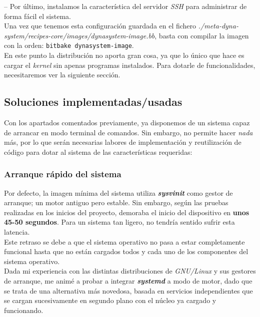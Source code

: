 -- Por último, instalamos la característica del servidor \textit{SSH} para administrar de forma fácil el sistema.\\

Una vez que tenemos esta configuración guardada en el fichero \textit{./meta-dyna-system/recipes-core/images/dynasystem-image.bb}, basta con compilar la imagen con la orden: \texttt{bitbake dynasystem-image}.\\

En este punto la distribución no aporta gran cosa, ya que lo único que hace es cargar el \textit{kernel} sin apenas programas instalados. Para dotarle de funcionalidades, necesitaremos ver la siguiente sección.

\subsection{Soluciones implementadas/usadas}

Con los apartados comentados previamente, ya disponemos de un sistema capaz de arrancar en modo terminal de comandos. Sin embargo, no permite hacer \textit{nada} más, por lo que serán necesarias labores de implementación y reutilización de código para dotar al sistema de las características requeridas:

\subsubsection{Arranque rápido del sistema}

Por defecto, la imagen mínima del sistema utiliza \textit{\textbf{sysvinit}} como gestor de arranque; un motor antiguo pero estable. Sin embargo, según las pruebas realizadas en los inicios del proyecto, demoraba el inicio del dispositivo en \textbf{unos 45-50 segundos}. Para un sistema tan ligero, no tendría sentido sufrir esta latencia.\\

Este retraso se debe a que el sistema operativo no pasa a estar completamente funcional hasta que no están cargados todos y cada uno de los componentes del sistema operativo.\\

Dada mi experiencia con las distintas distribuciones de \textit{GNU/Linux} y sus gestores de arranque, me animé a probar a integrar \textit{\textbf{systemd}} a modo de motor, dado que se trata de una alternativa más novedosa, basada en servicios independientes que se cargan sucesivamente en segundo plano con el núcleo ya cargado y funcionando.\\

